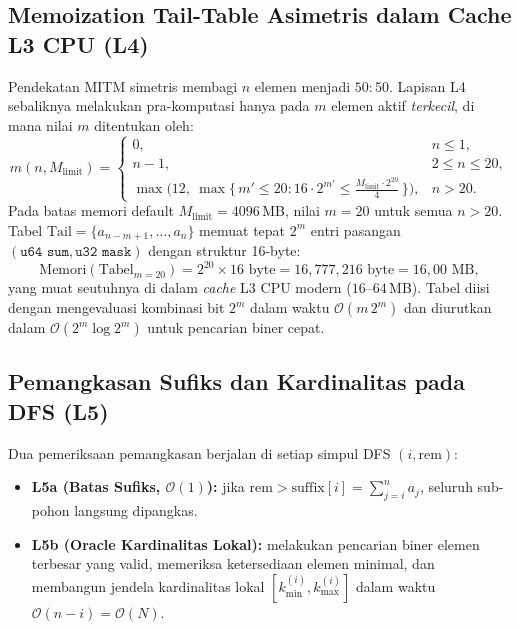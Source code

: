 \documentclass[journal,onecolumn,11pt]{IEEEtran}
\begin{document}
\subsection{Memoization Tail-Table Asimetris dalam Cache L3 CPU (L4)}
Pendekatan MITM simetris \cite{horowitz1974computing} membagi $n$ elemen menjadi $50{:}50$. Lapisan L4 sebaliknya melakukan pra-komputasi hanya pada $m$ elemen aktif \emph{terkecil}, di mana nilai $m$ ditentukan oleh:
\begin{equation}
    m(n, M_{\text{limit}}) =
    \begin{cases}
        0, & n \le 1,\\[2pt]
        n-1, & 2 \le n \le 20,\\[2pt]
        \displaystyle \max\Big(12,\ \max\{\, m' \le 20 : 16\cdot 2^{m'} \le \tfrac{M_{\text{limit}}\cdot 2^{20}}{4} \,\}\Big), & n > 20.
    \end{cases}
    \label{eq:choose_m}
\end{equation}
Pada batas memori default $M_{\text{limit}}=4096$\,MB, nilai $m=20$ untuk semua $n>20$. Tabel $\text{Tail} = \{a_{n-m+1},\dots,a_n\}$ memuat tepat $2^m$ entri pasangan $(\texttt{u64 sum}, \texttt{u32 mask})$ dengan struktur 16-byte:
\begin{equation}
    \text{Memori}(\text{Tabel}_{m=20}) = 2^{20}\times 16\text{ byte} = 16{,}777{,}216\text{ byte} = 16{,}00\text{ MB},
\end{equation}
yang muat seutuhnya di dalam \textit{cache} L3 CPU modern ($16$--$64$\,MB). Tabel diisi dengan mengevaluasi kombinasi bit $2^m$ dalam waktu $\mathcal{O}(m\,2^m)$ dan diurutkan dalam $\mathcal{O}(2^m\log 2^m)$ untuk pencarian biner cepat.

\subsection{Pemangkasan Sufiks dan Kardinalitas pada DFS (L5)}
Dua pemeriksaan pemangkasan berjalan di setiap simpul DFS $(i,\text{rem})$:
\begin{itemize}
    \item \textbf{L5a (Batas Sufiks, $\mathcal{O}(1)$):} jika $\text{rem} > \text{suffix}[i] = \sum_{j=i}^{n} a_j$, seluruh sub-pohon langsung dipangkas.
    \item \textbf{L5b (Oracle Kardinalitas Lokal):} melakukan pencarian biner elemen terbesar yang valid, memeriksa ketersediaan elemen minimal, dan membangun jendela kardinalitas lokal $[k_{\min}^{(i)}, k_{\max}^{(i)}]$ dalam waktu $\mathcal{O}(n-i) = \mathcal{O}(N)$.
\end{itemize}
\end{document}
